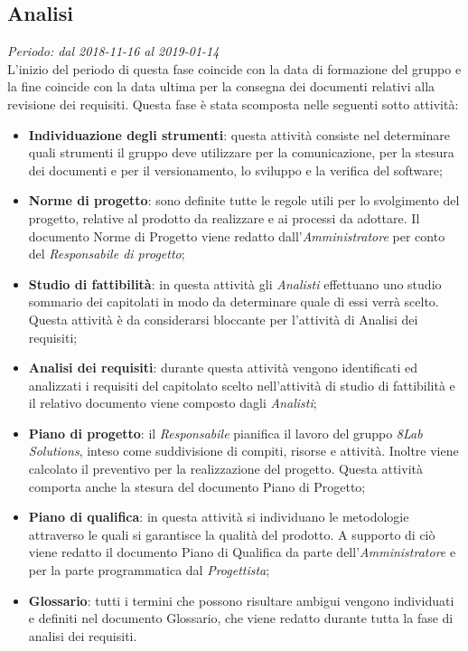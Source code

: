 \subsection{Analisi}
\textit{Periodo: dal 2018-11-16 al 2019-01-14}\\
L'inizio del periodo di questa fase coincide con la data di formazione del 
gruppo e la fine coincide con la data ultima per la consegna dei documenti relativi alla 
revisione dei requisiti. Questa fase è stata scomposta nelle seguenti sotto attività:
\begin{itemize}
	\item \textbf{Individuazione degli strumenti}: questa attività consiste nel 
	determinare quali strumenti il gruppo deve utilizzare per la comunicazione, per 
la stesura dei documenti e per il versionamento, lo sviluppo e la verifica del 
software; 
	\item \textbf{Norme di progetto}: sono definite tutte le regole utili per lo svolgimento del progetto, relative al prodotto da realizzare e ai processi da adottare. Il documento Norme di Progetto viene redatto dall'\textit{Amministratore} per conto del \textit{Responsabile di progetto};
	\item \textbf{Studio di fattibilità}: in questa attività gli \textit{Analisti} effettuano uno studio sommario dei capitolati in modo da determinare quale di essi verrà scelto. Questa attività è da considerarsi bloccante per l'attività di Analisi dei requisiti;
	\item \textbf{Analisi dei requisiti}: durante questa attività vengono 
	identificati ed analizzati i requisiti del capitolato scelto nell'attività 
	di studio di fattibilità e il relativo documento viene composto dagli \textit{Analisti};
	\item \textbf{Piano di progetto}: il \textit{Responsabile} pianifica il 
	lavoro del gruppo \textit{8Lab Solutions}, inteso come suddivisione di compiti, 
	risorse e attività. Inoltre viene calcolato il preventivo per la realizzazione 
	del progetto. Questa attività comporta anche la stesura 
	del documento Piano di Progetto;
	\item \textbf{Piano di qualifica}: in questa attività si individuano le 
	metodologie attraverso le quali si garantisce la qualità del prodotto. A supporto di ciò viene redatto il documento Piano di Qualifica da parte dell'\textit{Amministratore} e per la parte programmatica dal \textit{Progettista}; 
	\item \textbf{Glossario}: tutti i termini che possono risultare ambigui vengono individuati e definiti nel documento Glossario, che viene redatto durante tutta la fase di analisi dei requisiti.
\end{itemize}


